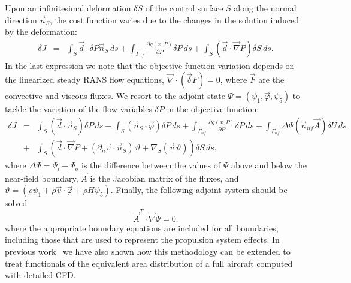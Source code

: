 \documentclass[]{aiaa-tc}
\begin{document}
%
Upon an infinitesimal deformation $\delta S$ of the control surface $S$ along the normal direction $\vec n_S$, the cost function varies due to the changes in the solution induced by the deformation:
\begin{eqnarray} \label{objvar}
\delta J &=&  \int_S{\vec d \cdot \delta P \vec n_S \,ds} + \int_{\Gamma_{nf}}{\frac{\partial g(x,P)}{\partial P}\delta P\,ds}  + \int_{S}{(\vec d\cdot\vec\nabla P )\delta S \,ds}.
\end{eqnarray}
%
In the last expression we note that the objective function variation depends on the linearized steady RANS flow equations, $\vec\nabla \cdot (\vec \delta F) = 0$, where $\vec F$ are the convective and viscous fluxes. We resort to the adjoint state $\Psi =(\psi_1, \vec \varphi, \psi_5 )$ to tackle the variation of the flow variables $\delta P$ in the objective function:
\begin{eqnarray}
\delta J &=&\int_S{(\vec d \cdot \vec n_S)\delta P  \,ds} - \int_{S}{(\vec n_S\cdot\vec \varphi) \delta P\,ds} + \int_{\Gamma_{nf}}{\frac{\partial g(x,P)}{\partial P}\delta P\,ds}  -  \int_{\Gamma_{nf}}{\Delta \Psi \left(\vec n_{nf} \vec A\right)\delta U\,ds} \nonumber \\
&+& \int_{S}{\left(\vec d\cdot\vec\nabla P + (\partial_n \vec v\cdot \vec n_S)\,\vartheta+\nabla_S(\vec v \,\vartheta )\right)\delta S\,ds},
\end{eqnarray}
where $\Delta \Psi = \Psi_i-\Psi_o$ is the difference between the values of $\Psi$ above and below the near-field boundary, $\vec A$ is the Jacobian matrix of the fluxes, and $\vartheta = (\rho \psi_1+\rho\vec v\cdot \vec\varphi+\rho H\psi_5)$. Finally, the following adjoint system should be solved
\begin{equation}
\vec A^T  \cdot \vec \nabla \Psi= 0.
\end{equation}
where the appropriate boundary equations are included for all boundaries, including those that are used to represent the propulsion system effects.  In previous work~\cite{Palacios:Adjoint-Based} we have also shown how this methodology can be extended to treat functionals of the equivalent area distribution of a full aircraft computed with detailed CFD.
\end{document}
